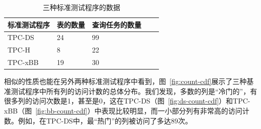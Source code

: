 \begin{table}[tbp]
    \centering
    \caption{三种标准测试程序的数据}
      \begin{tabularx}{.7\textwidth}{|l|X|X|X|r|}
      \hline
      \textbf{标准测试程序} & \textbf{表的数量} & \textbf{查询任务的数量}  \bigstrut\\ %
      \hline
      TPC-DS & 24  & 99 \bigstrut\\ %
      \hline
      TPC-H & 8  & 22 \bigstrut\\ %
      \hline
      TPC-xBB & 19  & 30 \bigstrut\\ %
      \hline
      \end{tabularx}%
    \label{tab:setup}
\end{table}


\par 相似的性质也能在另外两种标准测试程序中看到，图~\ref{fig:count-cdf}展示了三种基准测试程序中所有列的访问计数的总体分布。我们发现，多数的列是“冷门的”，有很多列的访问次数是1，甚至是0，这在TPC-DS（图~\ref{fig:ds-count-cdf}）和TPC-xBB（图~\ref{fig:bb-count-cdf}）中表现比较明显，而一小部分列有非常高的访问计数。例如，在TPC-DS中，最“热门”的列被访问了多达$89$次。


